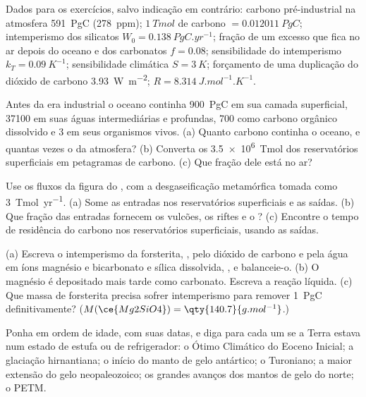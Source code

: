 Dados para os exercícios, salvo indicação em contrário: carbono pré-industrial na atmosfera
\qty{591}{PgC} (\qty{278}{ppm}); $\qty{1}{Tmol}$ de carbono $= \qty{0.012011}{PgC}$; intemperismo dos
silicatos $W_0 = \qty{0.138}{PgC.yr^{-1}}$; fração de um excesso que fica no ar depois do oceano e dos
carbonatos $f = 0.08$; sensibilidade do intemperismo $k_T = \qty{0.09}{K^{-1}}$; sensibilidade climática $S =
\qty{3}{K}$; forçamento de uma duplicação do dióxido de carbono \qty{3.93}{W.m^{-2}}; $R =
\qty{8.314}{J.mol^{-1}.K^{-1}}$.

\begin{exercise}[$\star$]\label{exo:b2:deep-time-climate:1}
Antes da era industrial o oceano continha \qty{900}{PgC} em sua camada superficial, \num{37100} em suas
águas intermediárias e profundas, 700 como carbono orgânico dissolvido e 3 em seus organismos vivos.
(a) Quanto carbono continha o oceano, e quantas vezes o da atmosfera? (b) Converta os
\qty{3.5e6}{Tmol} dos reservatórios superficiais em petagramas de carbono. (c) Que fração dele está no
ar?
\end{exercise}

\begin{exercise}[$\star$]\label{exo:b2:deep-time-climate:2}
Use os fluxos da figura do , com a desgaseificação metamórfica tomada como
\qty{3}{Tmol.yr^{-1}}. (a) Some as entradas nos reservatórios superficiais e as saídas.
(b) Que fração das entradas fornecem os vulcões, os riftes e o ? (c) Encontre o tempo de residência
do carbono nos reservatórios superficiais, usando as saídas.
\end{exercise}

\begin{exercise}[$\star$]\label{exo:b2:deep-time-climate:3}
(a) Escreva o intemperismo da forsterita, , pelo dióxido de carbono e pela água em íons magnésio
e bicarbonato e sílica dissolvida, , e balanceie-o. (b) O magnésio é depositado mais tarde
como carbonato. Escreva a reação líquida. (c) Que massa de forsterita precisa sofrer intemperismo para
remover \qty{1}{PgC} definitivamente? ($M(\ce{Mg2SiO4}) = \qty{140.7}{g.mol^{-1}}$.)
\end{exercise}

\begin{exercise}[$\star$]\label{exo:b2:deep-time-climate:4}
Ponha em ordem de idade, com suas datas, e diga para cada um se a Terra estava num estado de estufa ou de
refrigerador: o Ótimo Climático do Eoceno Inicial; a glaciação hirnantiana; o início do manto de gelo
antártico; o Turoniano; a maior extensão do gelo neopaleozoico; os grandes
avanços dos mantos de gelo do norte; o PETM.
\end{exercise}

